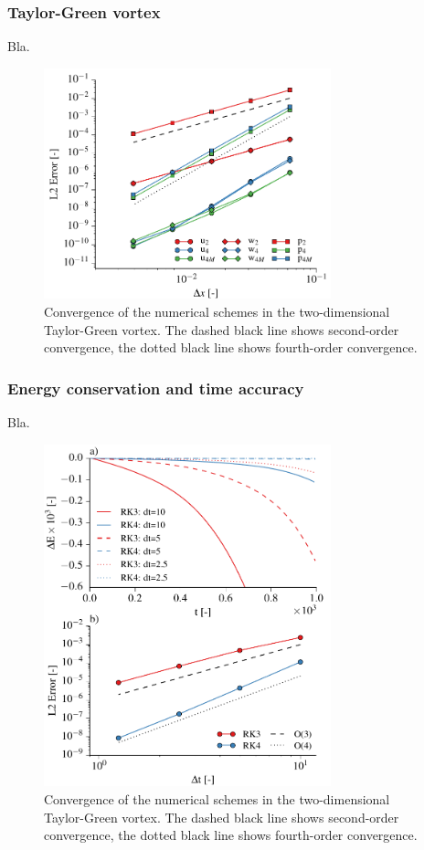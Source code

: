 \documentclass[gmd]{copernicus}
\begin{document}
\subsubsection{Taylor-Green vortex}
Bla.
\begin{figure}[t]
\vspace*{2mm}
\begin{center}
\includegraphics[width=8.3cm]{figs/taylorgreen.pdf}
\end{center}
\caption{Convergence of the numerical schemes in the two-dimensional Taylor-Green vortex. The dashed black line shows second-order convergence, the dotted black line shows fourth-order convergence.}
\end{figure}

\subsubsection{Energy conservation and time accuracy}\label{sec:validationtime}
Bla.
\begin{figure}[t]
\vspace*{2mm}
\begin{center}
\includegraphics[width=8.3cm]{figs/timeconvergence.pdf}
\end{center}
\caption{Convergence of the numerical schemes in the two-dimensional Taylor-Green vortex. The dashed black line shows second-order convergence, the dotted black line shows fourth-order convergence.}
\end{figure}
\end{document}
